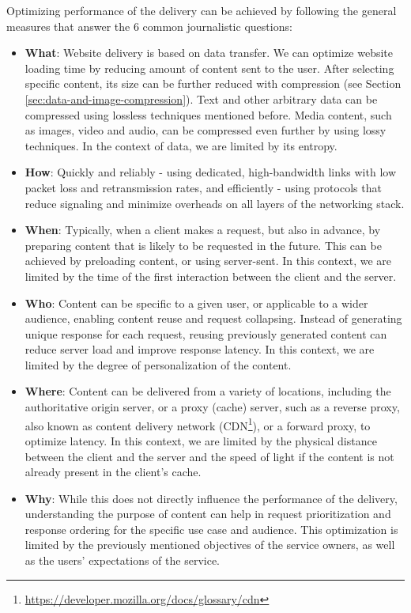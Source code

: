 Optimizing performance of the delivery can be achieved by following the general measures that answer the 6 common journalistic questions:
\begin{itemize}
  \item \textbf{What}: Website delivery is based on data transfer. We can optimize website loading time by reducing amount of content sent to the user. After selecting specific content, its size can be further reduced with compression (see Section \ref{sec:data-and-image-compression}). Text and other arbitrary data can be compressed using lossless techniques mentioned before. Media content, such as images, video and audio, can be compressed even further by using lossy techniques. In the context of data, we are limited by its entropy.
  \item \textbf{How}: Quickly and reliably - using dedicated, high-bandwidth links with low packet loss and retransmission rates, and efficiently - using protocols that reduce signaling and minimize overheads on all layers of the networking stack.
  \item \textbf{When}: Typically, when a client makes a request, but also in advance, by preparing content that is likely to be requested in the future. This can be achieved by preloading content, or using server-sent. In this context, we are limited by the time of the first interaction between the client and the server.
  \item \textbf{Who}: Content can be specific to a given user, or applicable to a wider audience, enabling content reuse and request collapsing. Instead of generating unique response for each request, reusing previously generated content can reduce server load and improve response latency. In this context, we are limited by the degree of personalization of the content.
  \item \textbf{Where}: Content can be delivered from a variety of locations, including the authoritative origin server, or a proxy (cache) server, such as a reverse proxy, also known as content delivery network (CDN\footnote{\url{https://developer.mozilla.org/docs/glossary/cdn}}), or a forward proxy, to optimize latency. In this context, we are limited by the physical distance between the client and the server and the speed of light if the content is not already present in the client's cache.
  \item \textbf{Why}: While this does not directly influence the performance of the delivery, understanding the purpose of content can help in request prioritization and response ordering for the specific use case and audience. This optimization is limited by the previously mentioned objectives of the service owners, as well as the users' expectations of the service.
\end{itemize}

